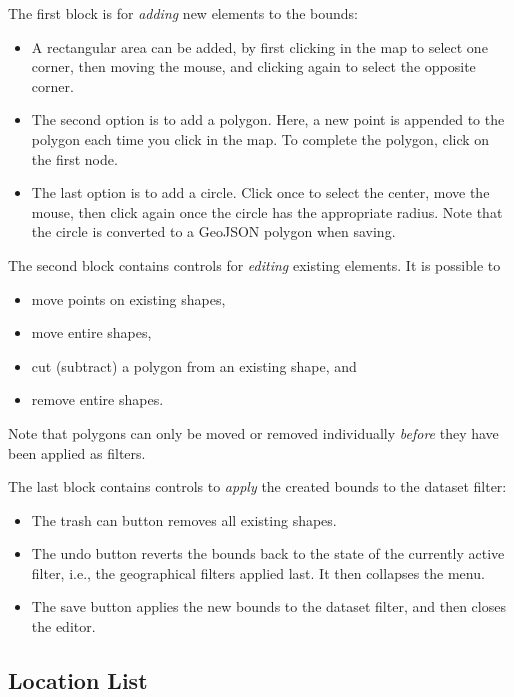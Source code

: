The first block is for \emph{adding} new elements to the bounds:
\begin{itemize}
  \item A rectangular area can be added, by first clicking in the map to select one corner, then moving the mouse, and clicking again to select the opposite corner.
  \item
    The second option is to add a polygon.
    Here, a new point is appended to the polygon each time you click in the map.
    To complete the polygon, click on the first node.
  \item
    The last option is to add a circle.
    Click once to select the center, move the mouse, then click again once the circle has the appropriate radius.
    Note that the circle is converted to a GeoJSON polygon when saving.
\end{itemize}

The second block contains controls for \emph{editing} existing elements.
It is possible to
\begin{itemize}
  \item move points on existing shapes,
  \item move entire shapes,
  \item cut (subtract) a polygon from an existing shape, and
  \item remove entire shapes.
\end{itemize}
Note that polygons can only be moved or removed individually \emph{before} they have been applied as filters.

The last block contains controls to \emph{apply} the created bounds to the dataset filter:

\begin{itemize}
  \item The trash can button removes all existing shapes.
  \item The  undo button reverts the bounds back to the state of the currently active filter, i.e., the geographical filters applied last.
    It then collapses the menu.
  \item The save button applies the new bounds to the dataset filter, and then closes the editor.
\end{itemize}


\subsection{Location List}
\label{sec:location-list}

